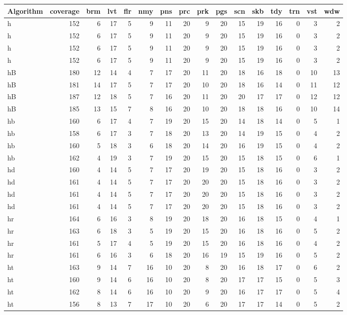 \begin{center}
\begin{tabular}{lrrrrrrrrrrrrrrr}
Algorithm & coverage & brm & lvt & flr & nmy & pns & prc & prk & pgs & scn & skb & tdy & trn & vst & wdw\\
\hline
h & 152 & 6 & 17 & 5 & 9 & 11 & 20 & 9 & 20 & 15 & 19 & 16 & 0 & 3 & 2\\
h & 152 & 6 & 17 & 5 & 9 & 11 & 20 & 9 & 20 & 15 & 19 & 16 & 0 & 3 & 2\\
h & 152 & 6 & 17 & 5 & 9 & 11 & 20 & 9 & 20 & 15 & 19 & 16 & 0 & 3 & 2\\
h & 152 & 6 & 17 & 5 & 9 & 11 & 20 & 9 & 20 & 15 & 19 & 16 & 0 & 3 & 2\\
hB & 180 & 12 & 14 & 4 & 7 & 17 & 20 & 11 & 20 & 18 & 16 & 18 & 0 & 10 & 13\\
hB & 181 & 14 & 17 & 5 & 7 & 17 & 20 & 10 & 20 & 18 & 16 & 14 & 0 & 11 & 12\\
hB & 187 & 12 & 18 & 5 & 7 & 16 & 20 & 11 & 20 & 20 & 17 & 17 & 0 & 12 & 12\\
hB & 185 & 13 & 15 & 7 & 8 & 16 & 20 & 10 & 20 & 18 & 18 & 16 & 0 & 10 & 14\\
hb & 160 & 6 & 17 & 4 & 7 & 19 & 20 & 15 & 20 & 14 & 18 & 14 & 0 & 5 & 1\\
hb & 158 & 6 & 17 & 3 & 7 & 18 & 20 & 13 & 20 & 14 & 19 & 15 & 0 & 4 & 2\\
hb & 160 & 5 & 18 & 3 & 6 & 18 & 20 & 14 & 20 & 16 & 19 & 15 & 0 & 4 & 2\\
hb & 162 & 4 & 19 & 3 & 7 & 19 & 20 & 15 & 20 & 15 & 18 & 15 & 0 & 6 & 1\\
hd & 160 & 4 & 14 & 5 & 7 & 17 & 20 & 19 & 20 & 15 & 18 & 16 & 0 & 3 & 2\\
hd & 161 & 4 & 14 & 5 & 7 & 17 & 20 & 20 & 20 & 15 & 18 & 16 & 0 & 3 & 2\\
hd & 161 & 4 & 14 & 5 & 7 & 17 & 20 & 20 & 20 & 15 & 18 & 16 & 0 & 3 & 2\\
hd & 161 & 4 & 14 & 5 & 7 & 17 & 20 & 20 & 20 & 15 & 18 & 16 & 0 & 3 & 2\\
hr & 164 & 6 & 16 & 3 & 8 & 19 & 20 & 18 & 20 & 16 & 18 & 15 & 0 & 4 & 1\\
hr & 163 & 6 & 18 & 3 & 5 & 19 & 20 & 15 & 20 & 16 & 18 & 16 & 0 & 5 & 2\\
hr & 161 & 5 & 17 & 4 & 5 & 19 & 20 & 15 & 20 & 16 & 18 & 16 & 0 & 4 & 2\\
hr & 161 & 6 & 16 & 3 & 6 & 18 & 20 & 16 & 19 & 15 & 19 & 16 & 0 & 5 & 2\\
ht & 163 & 9 & 14 & 7 & 16 & 10 & 20 & 8 & 20 & 16 & 18 & 17 & 0 & 6 & 2\\
ht & 160 & 9 & 14 & 6 & 16 & 10 & 20 & 8 & 20 & 17 & 17 & 15 & 0 & 5 & 3\\
ht & 162 & 8 & 14 & 6 & 16 & 10 & 20 & 9 & 20 & 16 & 17 & 17 & 0 & 5 & 4\\
ht & 156 & 8 & 13 & 7 & 17 & 10 & 20 & 6 & 20 & 17 & 17 & 14 & 0 & 5 & 2\\
\end{tabular}
\end{center}

